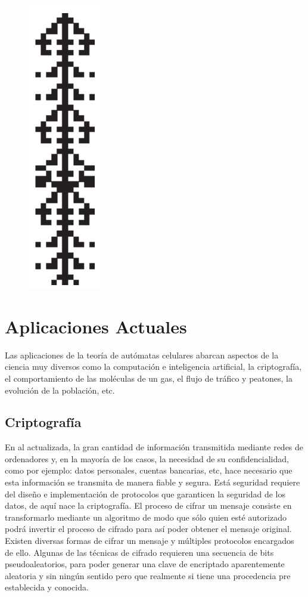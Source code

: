 \begin{figure}[H]
\centering
\includegraphics[scale=0.7]{imagenes/ejemplo_3.png}
\end{figure}




\section{Aplicaciones Actuales} %
Las aplicaciones de la teoría de autómatas celulares abarcan aspectos de la ciencia muy diversos como la computación e inteligencia artificial, la criptografía, el comportamiento de las moléculas de un gas, el flujo de tráfico y peatones, la evolución de la población, etc.

\subsection{Criptografía}
En al actualizada, la gran cantidad de información transmitida mediante redes de ordenadores y, en la mayoría de los casos, la necesidad de su confidencialidad, como por ejemplo: datos personales, cuentas bancarias, etc, hace necesario que esta información se transmita de manera fiable y segura. Está seguridad requiere del diseño e implementación de protocolos que garanticen la seguridad de los datos, de aquí nace la criptografía. El proceso de cifrar un mensaje consiste en transformarlo mediante un algoritmo de modo que sólo quien esté autorizado podrá invertir el proceso de cifrado para así poder obtener el mensaje original. Existen diversas formas de cifrar un mensaje y múltiples protocolos encargados de ello. Algunas de las técnicas de cifrado requieren una secuencia de bits pseudoaleatorios, para poder generar una clave de encriptado aparentemente aleatoria y sin ningún sentido pero que realmente si tiene una procedencia pre establecida y conocida.

